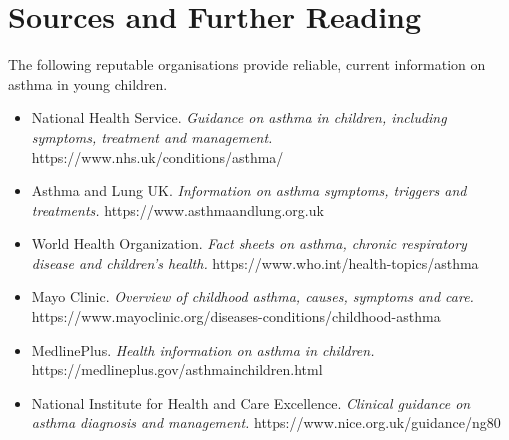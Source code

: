 \section*{Sources and Further Reading}
The following reputable organisations provide reliable, current information on asthma in young children.

\begin{itemize}
    \item National Health Service. \textit{Guidance on asthma in children, including symptoms, treatment and management.} https://www.nhs.uk/conditions/asthma/
    \item Asthma and Lung UK. \textit{Information on asthma symptoms, triggers and treatments.} https://www.asthmaandlung.org.uk
    \item World Health Organization. \textit{Fact sheets on asthma, chronic respiratory disease and children's health.} https://www.who.int/health-topics/asthma
    \item Mayo Clinic. \textit{Overview of childhood asthma, causes, symptoms and care.} https://www.mayoclinic.org/diseases-conditions/childhood-asthma
    \item MedlinePlus. \textit{Health information on asthma in children.} https://medlineplus.gov/asthmainchildren.html
    \item National Institute for Health and Care Excellence. \textit{Clinical guidance on asthma diagnosis and management.} https://www.nice.org.uk/guidance/ng80
\end{itemize}
